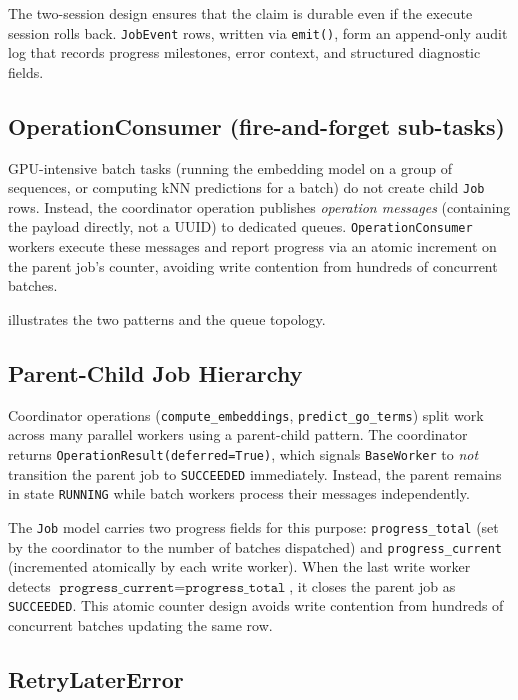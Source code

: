 The two-session design ensures that the claim is durable even if the execute
session rolls back. \texttt{JobEvent} rows, written via \texttt{emit()}, form an
append-only audit log that records progress milestones, error context, and
structured diagnostic fields.

\subsection{OperationConsumer (fire-and-forget sub-tasks)}
\label{subsec:operation-consumer}

GPU-intensive batch tasks (running the embedding model on a group of sequences,
or computing kNN predictions for a batch) do not create child \texttt{Job} rows.
Instead, the coordinator operation publishes \textit{operation messages}
(containing the payload directly, not a UUID) to dedicated queues.
\texttt{OperationConsumer} workers execute these messages and report progress
via an atomic increment on the parent job's counter, avoiding write contention
from hundreds of concurrent batches.

 illustrates the two patterns and the queue topology.

\subsection{Parent-Child Job Hierarchy}
\label{subsec:parent-child}

Coordinator operations (\texttt{compute\_embeddings}, \texttt{predict\_go\_terms})
split work across many parallel workers using a parent-child pattern. The
coordinator returns \texttt{OperationResult(deferred=True)}, which signals
\texttt{BaseWorker} to \emph{not} transition the parent job to
\texttt{SUCCEEDED} immediately. Instead, the parent remains in state
\texttt{RUNNING} while batch workers process their messages independently.

The \texttt{Job} model carries two progress fields for this purpose:
\texttt{progress\_total} (set by the coordinator to the number of batches
dispatched) and \texttt{progress\_current} (incremented atomically by each
write worker). When the last write worker detects
$\texttt{progress\_current} = \texttt{progress\_total}$, it closes the parent
job as \texttt{SUCCEEDED}. This atomic counter design avoids write contention
from hundreds of concurrent batches updating the same row.

\subsection{RetryLaterError}
\label{subsec:retry-later}

